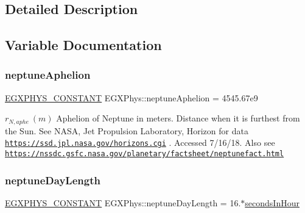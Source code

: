 \subsection{Detailed Description}


\subsection{Variable Documentation}
\mbox{\label{group___e_g_x_phys-_constants-_astrophysics-_solar_system-_neptune-_orbit_ga27321e20914f162c6ef996b34cfd2f7b}} 
\subsubsection{\texorpdfstring{neptune\+Aphelion}{neptuneAphelion}}
{\footnotesize\ttfamily \mbox{\hyperlink{group___e_g_x_phys-_constants-_macros_ga76980d288494ce1714c9ac68a95ba702}{E\+G\+X\+P\+H\+Y\+S\+\_\+\+C\+O\+N\+S\+T\+A\+NT}} E\+G\+X\+Phys\+::neptune\+Aphelion = 4545.\+67e9}

$ r_{N,aphe} \ (m)$ Aphelion of Neptune in meters. Distance when it is furthest from the Sun. See N\+A\+SA, Jet Propulsion Laboratory, Horizon for data \href{https://ssd.jpl.nasa.gov/horizons.cgi}{\tt https\+://ssd.\+jpl.\+nasa.\+gov/horizons.\+cgi} . Accessed 7/16/18. Also see \href{https://nssdc.gsfc.nasa.gov/planetary/factsheet/neptunefact.html}{\tt https\+://nssdc.\+gsfc.\+nasa.\+gov/planetary/factsheet/neptunefact.\+html} \mbox{\label{group___e_g_x_phys-_constants-_astrophysics-_solar_system-_neptune-_orbit_gacd9013fbed16c9aebd10d9186bc63b05}} 
\subsubsection{\texorpdfstring{neptune\+Day\+Length}{neptuneDayLength}}
{\footnotesize\ttfamily \mbox{\hyperlink{group___e_g_x_phys-_constants-_macros_ga76980d288494ce1714c9ac68a95ba702}{E\+G\+X\+P\+H\+Y\+S\+\_\+\+C\+O\+N\+S\+T\+A\+NT}} E\+G\+X\+Phys\+::neptune\+Day\+Length = 16.$\ast$\mbox{\hyperlink{namespace_e_g_x_phys_a7c3165cd93e36f1fb8e9fef80f117bef}{seconds\+In\+Hour}}}

